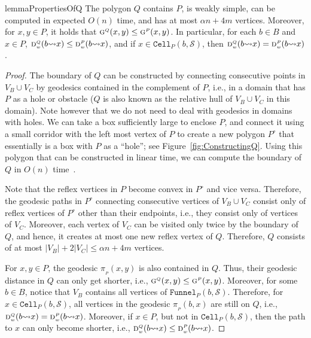 \documentclass[a4paper, 11pt]{article}
\newcommand{\s}{\mathcal S}
\newcommand{\g}[3][P]{\ensuremath{\textsc{g}^{\scriptscriptstyle #1}(#2, #3)}}
\newcommand{\dd}[3][P]{\ensuremath{\textsc{d}_{\scriptscriptstyle w}^{\scriptscriptstyle #1}(#2 {\leadsto} #3)}}
\newcommand{\p}[3][P]{\ensuremath{\pi_{_{#1}}(#2, #3)}}
\newcommand{\funnel}[2][P]{\ensuremath{\mathtt{Funnel}_{\scriptscriptstyle #1}(#2)}}
\newcommand{\cell}[2][P]{\ensuremath{\mathtt{Cell}_{\scriptscriptstyle #1}(#2)}}
\begin{document}
\begin{restatable}{lemma}{PropertiesOfQ}\label{lemma:PropertiesOfQ}
The polygon $Q$ contains $P$, is weakly simple, can be computed in expected $O(n)$ time, and has at most $\alpha n + 4m$ vertices.
Moreover, for $x,y\in P$, it holds that $\g[Q]{x}{y} \leq \g{x}{y}$. 
In particular, for each $b\in B$ and $x\in P$, $\dd[Q]{b}{x} \leq \dd{b}{x}$, and if $x\in \cell{b, \s}$, then $\dd[Q]{b}{x} = \dd{b}{x}$.
\end{restatable}
\begin{proof}
The boundary of $Q$ can be constructed by connecting consecutive  points in $V_B\cup V_C$ by geodesics contained in the complement of $P$, i.e., in a domain that has $P$ as a hole or obstacle ($Q$ is also known as the relative hull of $V_B\cup V_C$ in this domain). 
Note however that we do not need to deal with geodesics in domains with holes. 
We can take a box sufficiently large to enclose $P$, and connect it using a small corridor with the left most vertex of $P$ to create a new polygon $P^\circ$ that essentially is a box with $P$ as a ``hole''; see Figure~\ref{fig:ConstructingQ}. 
Using this polygon that can be constructed in linear time, we can compute the boundary of $Q$ in $O(n)$ time~\cite[Lemma 2]{kpairpath}.



Note that the reflex vertices in $P$ become convex in $P^\circ$ and vice versa. 
Therefore, the geodesic paths in $P^\circ$ connecting consecutive vertices of $V_B\cup V_C$ consist only of reflex vertices of $P^\circ$ other than their endpoints, i.e., they consist only of vertices of $V_C$.  
Moreover, each vertex of $V_C$ can be visited only twice by the boundary of $Q$, and hence, it creates at most one new reflex vertex of $Q$.
Therefore, $Q$ consists of at most $|V_B| +  2|V_C| \leq \alpha n + 4m$ vertices.

For $x,y\in P$, the geodesic $\p{x}{y}$ is also contained in $Q$. Thus, their geodesic distance in $Q$ can only get shorter, i.e., $\g[Q]{x}{y} \leq \g{x}{y}$.
Moreover, for some $b\in B$, notice that $V_B$ contains all vertices of $\funnel{b, \s}$. Therefore, for $x\in \cell{b,\s}$, all vertices in the geodesic $\p{b}{x}$ are still on $Q$, i.e., $\dd[Q]{b}{x} = \dd{b}{x}$. Moreover, if $x\in P$, but not in $\cell{b,\s}$, then the path to $x$ can only become shorter, i.e., $\dd[Q]{b}{x} \leq \dd{b}{x}$.
\end{proof}
\end{document}
